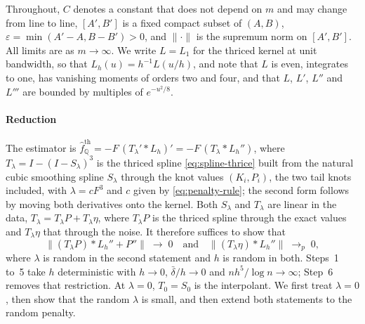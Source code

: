 \documentclass[preprint,12pt,authoryear,times]{elsarticle}
\newcommand{\Q}{\mathbb{Q}}
\newcommand{\fhat}{\hat f_{\Q}}
\begin{document}
Throughout, \(C\) denotes a constant that does not depend on \(m\) and may change from line to line, \([A',B']\) is a fixed compact subset of \((A,B)\), \(\varepsilon=\min(A'-A,B-B')>0\), and \(\|\cdot\|\) is the supremum norm on \([A',B']\). All limits are as \(m\to\infty\). We write \(L=L_1\) for the thriced kernel at unit bandwidth, so that \(L_h(u)=h^{-1}L(u/h)\), and note that \(L\) is even, integrates to one, has vanishing moments of orders two and four, and that \(L\), \(L'\), \(L''\) and \(L'''\) are bounded by multiples of \(e^{-u^2/8}\).

\paragraph{Reduction}
The estimator is \(\fhat^{\mathrm{th}}=-F\,(T_\lambda'\ast L_h)'=-F\,(T_\lambda\ast L_h'')\), where \(T_\lambda=I-(I-S_\lambda)^3\) is the thriced spline \eqref{eq:spline-thrice} built from the natural cubic smoothing spline \(S_\lambda\) through the knot values \((K_i,P_i)\), the two tail knots included, with \(\lambda=cF^3\) and \(c\) given by \eqref{eq:penalty-rule}; the second form follows by moving both derivatives onto the kernel. Both \(S_\lambda\) and \(T_\lambda\) are linear in the data, \(T_\lambda=T_\lambda P+T_\lambda\eta\), where \(T_\lambda P\) is the thriced spline through the exact values and \(T_\lambda\eta\) that through the noise. It therefore suffices to show that
\begin{equation}
\label{eq:pf-decomp}
\bigl\|(T_\lambda P)\ast L_h''+P''\bigr\|\;\to\;0
\quad\text{and}\quad
\bigl\|(T_\lambda\eta)\ast L_h''\bigr\|\;\to_p\;0 ,
\end{equation}
where \(\lambda\) is random in the second statement and \(h\) is random in both. Steps~1 to~5 take \(h\) deterministic with \(h\to 0\), \(\bar\delta/h\to 0\) and \(nh^5/\log n\to\infty\); Step~6 removes that restriction. At \(\lambda=0\), \(T_0=S_0\) is the interpolant. We first treat \(\lambda=0\), then show that the random \(\lambda\) is small, and then extend both statements to the random penalty.
\end{document}
